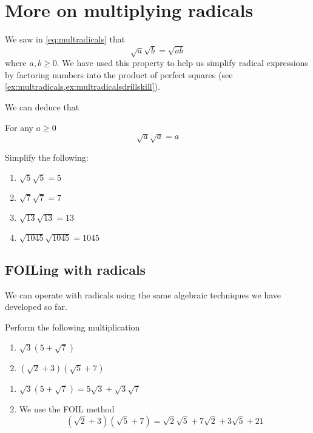 \section{More on multiplying radicals}
%
We saw in \vref{eq:multradicals} that
\[
	\sqrt{a}\sqrt{b} = \sqrt{ab}
\]
where $a, b\geq 0$. We have used this property to help us simplify radical 
expressions by factoring numbers into the product of perfect squares (see 
\cref{ex:multradicals,ex:multradicalsdrillskill}).

We can deduce that
\begin{myDefinition}
	For any $a\geq 0$
	\[
		\sqrt{a}\sqrt{a} = a
	\]
\end{myDefinition} 

\begin{myexample}
\drillandskill
Simplify the following:
\end{myexample}
\begin{multicols}{2}
	\begin{enumerate}
		\item $\sqrt{5}\sqrt{5} = 5$
		\item $\sqrt{7}\sqrt{7} = 7$
		\item $\sqrt{13}\sqrt{13}=13$
		\item $\sqrt{1045}\sqrt{1045}=1045$
	\end{enumerate} 
\end{multicols}

\subsection{FOILing with radicals}
We can operate with radicals using the same algebraic techniques we have 
developed so far.

\begin{myexample}
Perform the following multiplication
\begin{multicols}{2}
	\begin{enumerate}
		\item $\sqrt{3}(5+\sqrt{7})$
		\item $(\sqrt{2}+3)(\sqrt{5}+7)$
	\end{enumerate} 
\end{multicols}
\end{myexample}
\begin{myProof}
	\begin{enumerate}
		\item $ \sqrt{3}(5+\sqrt{7})  =  5\sqrt{3}+\sqrt{3}\sqrt{7} $
		\item We use the \gls{FOIL} method
		\[ 
			(\sqrt{2}+3)(\sqrt{5}+7)  =  \sqrt{2}\sqrt{5}+7\sqrt{2}+3\sqrt{5}+21
		\]
	\end{enumerate} 
\end{myProof} 

